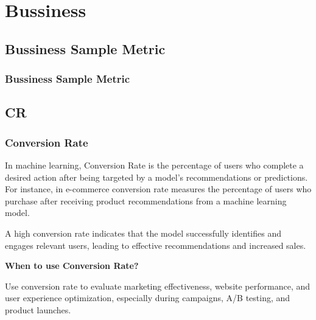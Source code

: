 \chapter{Bussiness}


\clearpage
\thispagestyle{businessstyle}
\section{Bussiness Sample Metric}
\subsection{Bussiness Sample Metric}

\clearpage
\thispagestyle{businessstyle}

\section{CR}

\subsection{Conversion Rate}
In machine learning, Conversion Rate is the percentage of users who complete a desired action after being targeted by a model's recommendations or predictions.
For instance, in e-commerce conversion rate measures the percentage of users who purchase after receiving product recommendations from a machine learning model.

\begin{center}
\end{center}

\vspace{-10pt}

A high conversion rate indicates that the model successfully identifies and engages relevant users, leading to effective recommendations and increased sales.

\textbf{When to use Conversion Rate?}

Use conversion rate to evaluate marketing effectiveness, website performance, and user experience optimization, especially during campaigns, A/B testing, and product launches.

